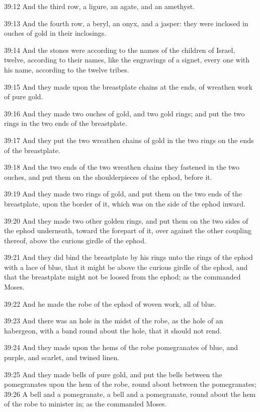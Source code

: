 39:12 And the third row, a ligure, an agate, and an amethyst.

39:13 And the fourth row, a beryl, an onyx, and a jasper: they were inclosed in ouches of gold in their inclosings.

39:14 And the stones were according to the names of the children of Israel, twelve, according to their names, like the engravings of a signet, every one with his name, according to the twelve tribes.

39:15 And they made upon the breastplate chains at the ends, of wreathen work of pure gold.

39:16 And they made two ouches of gold, and two gold rings; and put the two rings in the two ends of the breastplate.

39:17 And they put the two wreathen chains of gold in the two rings on the ends of the breastplate.

39:18 And the two ends of the two wreathen chains they fastened in the two ouches, and put them on the shoulderpieces of the ephod, before it.

39:19 And they made two rings of gold, and put them on the two ends of the breastplate, upon the border of it, which was on the side of the ephod inward.

39:20 And they made two other golden rings, and put them on the two sides of the ephod underneath, toward the forepart of it, over against the other coupling thereof, above the curious girdle of the ephod.

39:21 And they did bind the breastplate by his rings unto the rings of the ephod with a lace of blue, that it might be above the curious girdle of the ephod, and that the breastplate might not be loosed from the ephod; as the \LORD commanded Moses.

39:22 And he made the robe of the ephod of woven work, all of blue.

39:23 And there was an hole in the midst of the robe, as the hole of an habergeon, with a band round about the hole, that it should not rend.

39:24 And they made upon the hems of the robe pomegranates of blue, and purple, and scarlet, and twined linen.

39:25 And they made bells of pure gold, and put the bells between the pomegranates upon the hem of the robe, round about between the pomegranates; 39:26 A bell and a pomegranate, a bell and a pomegranate, round about the hem of the robe to minister in; as the \LORD commanded Moses.

